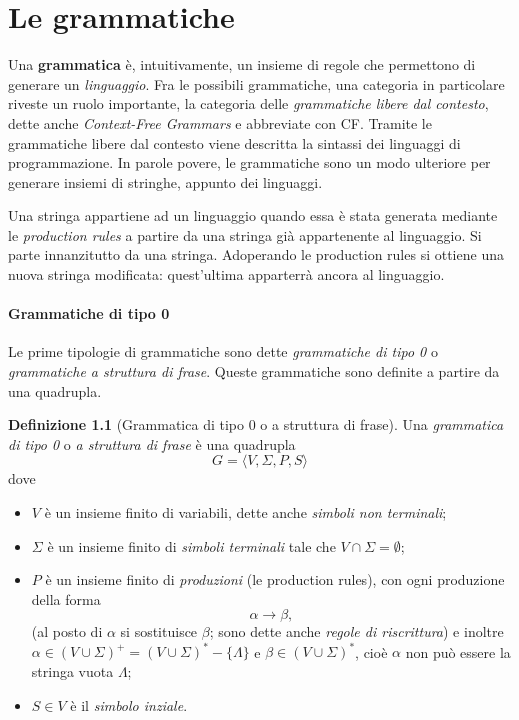 \documentclass[10pt]{\classname}
\theoremstyle{definition}
\newtheorem{definizione}{Definizione}[section]
\theoremstyle{definition}
\theoremstyle{definition}
\theoremstyle{definition}
\begin{document}
\clearpage

\chapter{Le grammatiche}

Una \textbf{grammatica} è, intuitivamente, un insieme di regole che permettono
di generare un \emph{linguaggio}. Fra le possibili grammatiche, una categoria
in particolare riveste un ruolo importante, la categoria delle
\emph{grammatiche libere dal contesto}, dette anche \emph{Context-Free
Grammars} e abbreviate con CF. Tramite le grammatiche libere dal contesto viene
descritta la sintassi dei linguaggi di programmazione. In parole povere, le
grammatiche sono un modo ulteriore per generare insiemi di stringhe, appunto
dei linguaggi.

Una stringa appartiene ad un linguaggio quando essa è stata generata mediante
le \emph{production rules} a partire da una stringa già appartenente al
linguaggio. Si parte innanzitutto da una stringa. Adoperando le production
rules si ottiene una nuova stringa modificata: quest'ultima apparterrà ancora
al linguaggio.

\subsubsection{Grammatiche di tipo 0}

Le prime tipologie di grammatiche sono dette \emph{grammatiche di tipo 0} o
\emph{grammatiche a struttura di frase}. Queste grammatiche sono definite a
partire da una quadrupla. 

\begin{definizione}[Grammatica di tipo 0 o a struttura di frase] Una \emph{grammatica di tipo 0} o \emph{a struttura di frase} è una quadrupla $$G = \langle V, \Sigma, P, S\rangle$$ dove 
\begin{itemize}
    \item $V$ è un insieme finito di variabili, dette anche \emph{simboli non terminali}; 
    \item $\Sigma$ è un insieme finito di \emph{simboli terminali} tale che $V \cap \Sigma =
\emptyset$; 
    \item $P$ è un insieme finito di \emph{produzioni} (le production rules), con ogni produzione della forma $$\alpha \rightarrow \beta,$$ (al posto di $\alpha$ si sostituisce $\beta$; sono dette anche \emph{regole di riscrittura}) e inoltre $\alpha \in (V \cup \Sigma)^+ = (V \cup \Sigma)^* - \{\Lambda\}$ e $\beta \in (V \cup \Sigma)^*$, cioè $\alpha$ non può essere la stringa vuota $\Lambda$;
    \item $S \in V$ è il \emph{simbolo inziale}.
\end{itemize}
\end{definizione}
\end{document}
